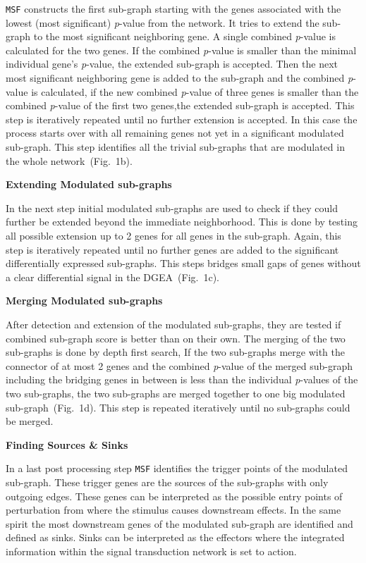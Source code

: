 \documentclass[twocolumn]{article}
\begin{document}
\texttt{MSF} constructs the first sub-graph starting with the genes
associated with the lowest (most significant) \textit{p}-value from
the network. It tries to extend the
sub-graph to the most significant neighboring gene. A single combined
\textit{p}-value is calculated for the two genes. If the combined
\textit{p}-value is smaller than the minimal individual gene's
\textit{p}-value, the extended sub-graph is accepted. Then the next most significant neighboring gene is added to the sub-graph and the combined \textit{p}-value is calculated, if the new combined \textit{p}-value of three genes is smaller than the combined \textit{p}-value of the first two genes,the extended sub-graph is accepted. This step is iteratively repeated until no further extension is accepted. In this case the process starts over with all remaining genes not yet in a
significant modulated sub-graph. This step identifies all the trivial
sub-graphs that are modulated in the whole network~(Fig.~1b).\newline

\textbf{Extending Modulated sub-graphs}

In the next step initial modulated sub-graphs are used to check if
they could further be extended beyond the immediate neighborhood.
This is done by testing all possible extension up to 2 genes for
all genes in the sub-graph. Again, this step is iteratively repeated until no
further genes are added to the significant differentially expressed
sub-graphs. This steps bridges small gaps of genes without a clear
differential signal in the DGEA~(Fig.~1c).\newline

\textbf{Merging Modulated sub-graphs}

After detection and extension of the modulated sub-graphs, they are
tested if combined sub-graph score is better than on their own. The merging of the two sub-graphs is done by depth first search, If the two sub-graphs merge with the connector of at most 2 genes and the
combined \textit{p}-value of the merged sub-graph including the
bridging genes in between is less than the individual
\textit{p}-values of the two sub-graphs, the two sub-graphs are merged
together to one big modulated sub-graph~(Fig.~1d). This step is repeated iteratively until no sub-graphs could be merged.\newline
 
\textbf{Finding Sources \& Sinks}

In a last post processing step \texttt{MSF} identifies the trigger
points of the modulated sub-graph. These trigger genes are the sources
of the sub-graphs with only outgoing edges. These genes can be
interpreted as the possible entry points of perturbation from where the
stimulus causes downstream effects. In the same spirit the most
downstream genes of the modulated sub-graph are identified and defined
as sinks. Sinks can be interpreted as the effectors where the
integrated information within the signal transduction network is set
to action.
\end{document}
